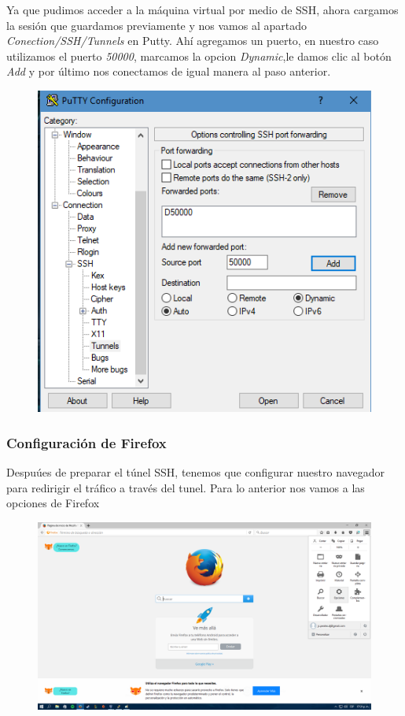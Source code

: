 \documentclass{article}
\begin{document}
Ya que pudimos acceder a la m\'aquina virtual por medio de SSH, ahora cargamos la sesi\'on que guardamos previamente y nos vamos al apartado \emph{Conection/SSH/Tunnels} en Putty. Ah\'i agregamos un puerto, en nuestro caso utilizamos el puerto \emph{50000}, marcamos la opcion \emph{Dynamic},le damos clic al bot\'on \emph{Add} y por \'ultimo nos conectamos de igual manera al paso anterior.

\begin{figure}[H]
\centering
\includegraphics[width=1\textwidth]{10-PUERTO50000}
\end{figure}

\subsubsection{Configuraci\'on de Firefox}

Despu\'ues de preparar el t\'unel SSH, tenemos que configurar nuestro navegador para redirigir el tr\'afico a trav\'es del tunel. Para lo anterior nos vamos a las opciones de Firefox

\begin{figure}[H]
\centering
\includegraphics[width=1\textwidth]{11-OPCIONESFIREFOX}
\end{figure}
\end{document}
